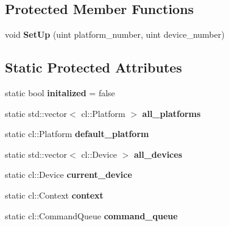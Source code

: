 \subsection*{Protected Member Functions}
\begin{DoxyCompactItemize}
\item 
void {\bfseries Set\+Up} (uint platform\+\_\+number, uint device\+\_\+number)\hypertarget{classjaspl_1_1ocl_1_1_open_c_l_base_a18031bd6b0e52aefeff4b28e98fcda96}{}\label{classjaspl_1_1ocl_1_1_open_c_l_base_a18031bd6b0e52aefeff4b28e98fcda96}

\end{DoxyCompactItemize}
\subsection*{Static Protected Attributes}
\begin{DoxyCompactItemize}
\item 
static bool {\bfseries initalized} = false\hypertarget{classjaspl_1_1ocl_1_1_open_c_l_base_ad8942a3114b511028404945d2b658689}{}\label{classjaspl_1_1ocl_1_1_open_c_l_base_ad8942a3114b511028404945d2b658689}

\item 
static std\+::vector$<$ cl\+::\+Platform $>$ {\bfseries all\+\_\+platforms}\hypertarget{classjaspl_1_1ocl_1_1_open_c_l_base_aca4e1b8a9db57208f0f4aa93053551c5}{}\label{classjaspl_1_1ocl_1_1_open_c_l_base_aca4e1b8a9db57208f0f4aa93053551c5}

\item 
static cl\+::\+Platform {\bfseries default\+\_\+platform}\hypertarget{classjaspl_1_1ocl_1_1_open_c_l_base_adba19ace68e13d2aef858d62be78305d}{}\label{classjaspl_1_1ocl_1_1_open_c_l_base_adba19ace68e13d2aef858d62be78305d}

\item 
static std\+::vector$<$ cl\+::\+Device $>$ {\bfseries all\+\_\+devices}\hypertarget{classjaspl_1_1ocl_1_1_open_c_l_base_a38970dc6296c7e86cbd2e53ed96dbf89}{}\label{classjaspl_1_1ocl_1_1_open_c_l_base_a38970dc6296c7e86cbd2e53ed96dbf89}

\item 
static cl\+::\+Device {\bfseries current\+\_\+device}\hypertarget{classjaspl_1_1ocl_1_1_open_c_l_base_ab98895e065dcdbb77e82d68fe50f3656}{}\label{classjaspl_1_1ocl_1_1_open_c_l_base_ab98895e065dcdbb77e82d68fe50f3656}

\item 
static cl\+::\+Context {\bfseries context}\hypertarget{classjaspl_1_1ocl_1_1_open_c_l_base_a630838c8c08a6bda110e04c2dda66850}{}\label{classjaspl_1_1ocl_1_1_open_c_l_base_a630838c8c08a6bda110e04c2dda66850}

\item 
static cl\+::\+Command\+Queue {\bfseries command\+\_\+queue}\hypertarget{classjaspl_1_1ocl_1_1_open_c_l_base_a96aae0bed8da50e336194b437c159e4a}{}\label{classjaspl_1_1ocl_1_1_open_c_l_base_a96aae0bed8da50e336194b437c159e4a}

\end{DoxyCompactItemize}



